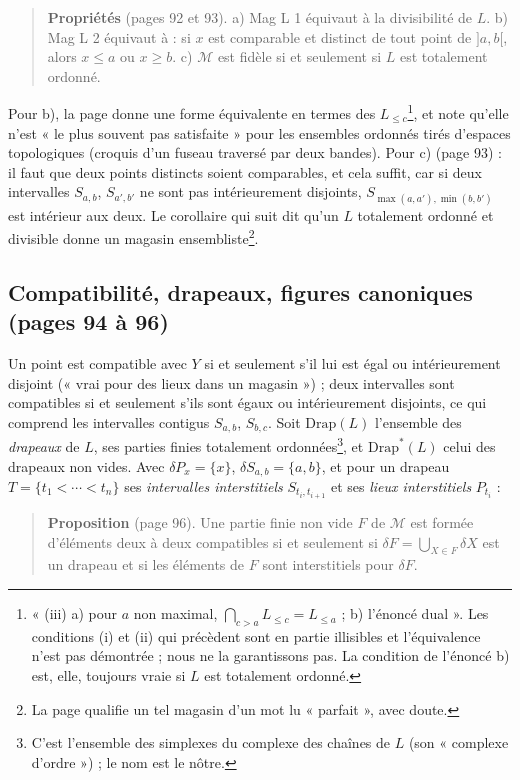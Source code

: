 \documentclass[11pt,a4paper]{article}
\begin{document}
\begin{quote}
\textbf{Propriétés} (pages 92 et 93). a) Mag L 1 équivaut à la divisibilité de
$L$. b) Mag L 2 équivaut à : si $x$ est comparable et distinct de tout point de
$]a,b[$, alors $x \leq a$ ou $x \geq b$. c) $\mathcal{M}$ est fidèle si et
seulement si $L$ est totalement ordonné.
\end{quote}

Pour b), la page donne une forme équivalente en termes des
$L_{\leq c}$\footnote{« (iii) a) pour $a$ non maximal, $\bigcap_{c > a}
L_{\leq c} = L_{\leq a}$ ; b) l'énoncé dual ». Les conditions (i) et (ii) qui
précèdent sont en partie illisibles et l'équivalence n'est pas démontrée ; nous
ne la garantissons pas. La condition de l'énoncé b) est, elle, toujours vraie si
$L$ est totalement ordonné.}, et note qu'elle n'est « le plus souvent pas
satisfaite » pour les ensembles ordonnés tirés d'espaces topologiques (croquis
d'un fuseau traversé par deux bandes). Pour c) (page 93) : il faut que deux
points distincts soient comparables, et cela suffit, car si deux intervalles
$S_{a,b}$, $S_{a',b'}$ ne sont pas intérieurement disjoints,
$S_{\max(a,a'),\min(b,b')}$ est intérieur aux deux. Le corollaire qui suit dit
qu'un $L$ totalement ordonné et divisible donne un magasin
ensembliste\footnote{La page qualifie un tel magasin d'un mot lu
« parfait », avec doute.}.

\subsection*{Compatibilité, drapeaux, figures canoniques (pages 94 à 96)}

Un point est compatible avec $Y$ si et seulement s'il lui est égal ou
intérieurement disjoint (« vrai pour des lieux dans un magasin ») ; deux
intervalles sont compatibles si et seulement s'ils sont égaux ou intérieurement
disjoints, ce qui comprend les intervalles contigus $S_{a,b}$, $S_{b,c}$. Soit
$\mathrm{Drap}(L)$ l'ensemble des \emph{drapeaux} de $L$, ses parties finies
totalement ordonnées\footnote{C'est l'ensemble des simplexes du complexe des
chaînes de $L$ (son « complexe d'ordre ») ; le nom est le nôtre.}, et
$\mathrm{Drap}^{*}(L)$ celui des drapeaux non vides. Avec $\delta P_{x} = \{x\}$,
$\delta S_{a,b} = \{a, b\}$, et pour un drapeau $T = \{t_{1} < \cdots < t_{n}\}$
ses \emph{intervalles interstitiels} $S_{t_{i}, t_{i+1}}$ et ses \emph{lieux
interstitiels} $P_{t_{i}}$ :

\begin{quote}
\textbf{Proposition} (page 96). Une partie finie non vide $F$ de $\mathcal{M}$
est formée d'éléments deux à deux compatibles si et seulement si $\delta F =
\bigcup_{X \in F} \delta X$ est un drapeau et si les éléments de $F$ sont
interstitiels pour $\delta F$.
\end{quote}
\end{document}
